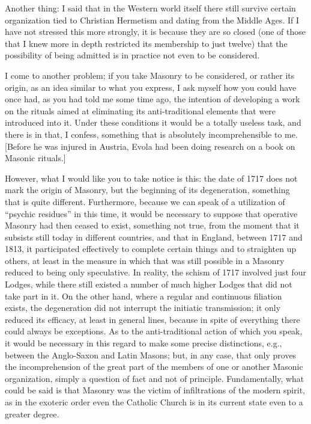 Another thing: I said that in the Western world itself there still survive certain organization tied to Christian Hermetism and dating from the Middle Ages. If I have not stressed this more strongly, it is because they are so closed (one of those that I knew more in depth restricted its membership to just twelve) that the possibility of being admitted is in practice not even to be considered.

I come to another problem; if you take Masonry to be considered, or rather its origin, as an idea similar to what you express, I ask myself how you could have once had, as you had told me some time ago, the intention of developing a work on the rituals aimed at eliminating its anti-traditional elements that were introduced into it. Under these conditions it would be a totally useless task, and there is in that, I confess, something that is absolutely incomprehensible to me. [Before he was injured in Austria, Evola had been doing research on a book on Masonic rituals.]

However, what I would like you to take notice is this: the date of 1717 does not mark the origin of Masonry, but the beginning of its degeneration, something that is quite different. Furthermore, because we can speak of a utilization of “psychic residues” in this time, it would be necessary to suppose that operative Masonry had then ceased to exist, something not true, from the moment that it subsists still today in different countries, and that in England, between 1717 and 1813, it participated effectively to complete certain things and to straighten up others, at least in the measure in which that was still possible in a Masonry reduced to being only speculative. In reality, the schism of 1717 involved just four Lodges, while there still existed a number of much higher Lodges that did not take part in it. On the other hand, where a regular and continuous filiation exists, the degeneration did not interrupt the initiatic transmission; it only reduced its efficacy, at least in general lines, because in spite of everything there could always be exceptions. As to the anti-traditional action of which you speak, it would be necessary in this regard to make some precise distinctions, e.g., between the Anglo-Saxon and Latin Masons; but, in any case, that only proves the incomprehension of the great part of the members of one or another Masonic organization, simply a question of fact and not of principle. Fundamentally, what could be said is that Masonry was the victim of infiltrations of the modern spirit, as in the exoteric order even the Catholic Church is in its current state even to a greater degree.

